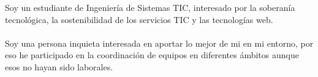 \documentclass[9pt]{developercv} %
\begin{document}
\vspace{0.5cm}



\begin{minipage}[t]{0.4\textwidth} %
	\vspace{-\baselineskip} %
	
    Soy un estudiante de Ingeniería de Sistemas TIC, interesado por la soberanía tecnológica, la sostenibilidad de los servicios TIC y las tecnologías web.
    \\
    \\
    Soy una persona inquieta interesada en aportar lo mejor de mi en mi entorno, por eso he participado en la coordinación de equipos en diferentes ámbitos aunque esos no hayan sido laborales.
\end{minipage}
\hfill %
\begin{minipage}[t]{0.5\textwidth} %
	\vspace{-\baselineskip} %
	\begin{barchart}{5.5}
	\end{barchart}
\end{minipage}


\end{document}
